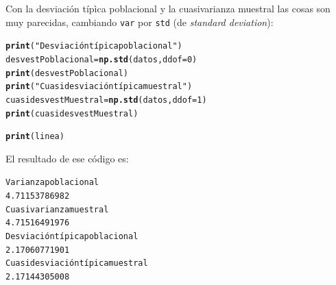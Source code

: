 \documentclass[10pt,a4paper]{article}\usepackage[]{graphicx}\usepackage[]{color}
\makeatletter
\newcommand{\hlnum}[1]{\textcolor[rgb]{0.686,0.059,0.569}{#1}}%
\newcommand{\hlstr}[1]{\textcolor[rgb]{0.192,0.494,0.8}{#1}}%
\newcommand{\hlstd}[1]{\textcolor[rgb]{0.345,0.345,0.345}{#1}}%
\newcommand{\hlkwb}[1]{\textcolor[rgb]{0.69,0.353,0.396}{#1}}%
\newcommand{\hlkwc}[1]{\textcolor[rgb]{0.333,0.667,0.333}{#1}}%
\newcommand{\hlkwd}[1]{\textcolor[rgb]{0.737,0.353,0.396}{\textbf{#1}}}%
\newenvironment{kframe}{%
 \def\at@end@of@kframe{}%
 \ifinner\ifhmode%
  \def\at@end@of@kframe{\end{minipage}}%
  \begin{minipage}{\columnwidth}%
 \fi\fi%
 \def\FrameCommand##1{\hskip\@totalleftmargin \hskip-\fboxsep
 \colorbox{shadecolor}{##1}\hskip-\fboxsep
     \hskip-\linewidth \hskip-\@totalleftmargin \hskip\columnwidth}%
 \MakeFramed {\advance\hsize-\width
   \@totalleftmargin\z@ \linewidth\hsize
   \@setminipage}}%
 {\par\unskip\endMakeFramed%
 \at@end@of@kframe}
\newenvironment{knitrout}{}{} %
\makeatother
\begin{document}
Con la desviación típìca poblacional y la cuasivarianza muestral las cosas son muy parecidas, cambiando {\tt var} por {\tt std} (de {\em standard deviation}):
\begin{knitrout}
\color{fgcolor}\begin{kframe}
\begin{alltt}
\hlkwd{print}\hlstd{(}\hlstr{"Desviación típica poblacional"}\hlstd{)}
\hlstd{desvestPoblacional} \hlkwb{=} \hlkwd{np.std}\hlstd{(datos,} \hlkwc{ddof}\hlstd{=}\hlnum{0}\hlstd{)}
\hlkwd{print}\hlstd{(desvestPoblacional)}
\hlkwd{print}\hlstd{(}\hlstr{"Cuasidesviación típica muestral"}\hlstd{)}
\hlstd{cuasidesvestMuestral} \hlkwb{=} \hlkwd{np.std}\hlstd{(datos,} \hlkwc{ddof}\hlstd{=}\hlnum{1}\hlstd{)}
\hlkwd{print}\hlstd{(cuasidesvestMuestral)}

\hlkwd{print}\hlstd{(linea)}
\end{alltt}
\end{kframe}
\end{knitrout}
El resultado de ese código es:
\begin{knitrout}
\color{fgcolor}\begin{kframe}
\begin{alltt}
Varianza poblacional
4.71153786982
Cuasivarianza muestral
4.71516491976
Desviación típica poblacional
2.17060771901
Cuasidesviación típica muestral
2.17144305008
\end{alltt}
\end{kframe}
\end{knitrout}
\end{document}
